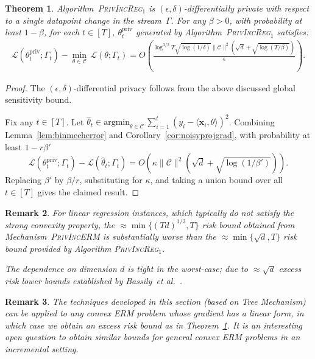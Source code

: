 \documentclass{article}
\theoremstyle{plain}
\newtheorem{theorem}{Theorem}[section]
\newtheorem{remark}[theorem]{Remark}
\def \TreeMech {\textsc{TreeMech}\xspace}
\def \PrivIncERM {\textsc{PrivIncERM}\xspace}
\def \PrivIncReg {\textsc{PrivIncReg$_1$}\xspace}
\def \eps {\epsilon}
\def \CCC {\mathcal{C}}
\def \LLL {\mathcal{L}}
\def \priv {{\mathrm{priv}}}
\def \x {\mathbf x}
\begin{document}
\begin{theorem} \label{thm:thm2}
Algorithm~\PrivIncReg is $(\eps,\delta)$-differentially private with respect to a single datapoint change in the stream~$\Gamma$. For any $\beta > 0$, with probability at least $1-\beta$, for each $t \in [T]$, $\theta^\priv_t$ generated by Algorithm~\PrivIncReg satisfies:
\begin{align*}
\LLL(\theta^\priv_t; \Gamma_t)  - \min_{\theta \in \CCC}\, \LLL(\theta; \Gamma_t) =  O \left ( \frac{\log^{3/2} T \sqrt{\log(1/\delta)} \| \CCC \|^2 (\sqrt{d}+\sqrt{\log(T/\beta)})}{\eps}\right ).
\end{align*}
\end{theorem} 
\begin{proof}
The $(\eps,\delta)$-differential privacy follows from the above discussed global sensitivity bound.

Fix any $t \in [T]$. Let $\hat{\theta}_t \in \mbox{argmin}_{\theta \in \CCC}\, \sum_{i=1}^t (y_i - \langle \x_i,\theta \rangle)^2$. Combining Lemma~\ref{lem:binmecherror} and Corollary~\ref{cor:noisyprojgrad}, with probability at least $1-r\beta'$
$$\LLL(\theta^\priv_t; \Gamma_t) - \LLL(\hat{\theta}_t; \Gamma_t) = O\left ( \kappa \| \CCC \|^2 (\sqrt{d}+\sqrt{\log(1/\beta')})\right).$$
Replacing $\beta'$ by $\beta/r$, substituting for $\kappa$, and taking a union bound over all $t \in [T]$ gives the claimed result.
\end{proof}

\begin{remark}
For linear regression instances, which typically do not satisfy the strong convexity property, the $\approx \min\{(Td)^{1/3},T\}$ risk bound obtained from Mechanism~\PrivIncERM is substantially worse than the $\approx \min\{\sqrt{d},T\}$ risk bound provided by Algorithm \PrivIncReg.  

The dependence on dimension $d$ is tight in the worst-case; due to $\approx \sqrt{d}$ excess risk lower bounds established by Bassily~\emph{et al.}\ \cite{bassily2014differentially}. 
\end{remark}

\begin{remark}
The techniques developed in this section (based on Tree Mechanism) can be applied to any convex ERM problem whose gradient has a {\em linear} form, in which case we obtain an excess risk bound as in Theorem~\ref{thm:thm2}.  It is an interesting open question to obtain similar bounds for general convex ERM problems in an incremental setting. 
\end{remark}
\end{document}

